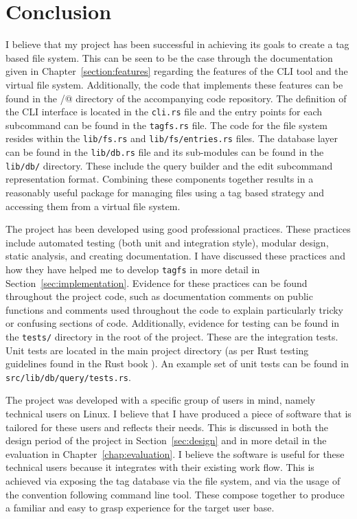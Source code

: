 \chapter{Conclusion}
\vspace{1cm}

I believe that my project has been successful in achieving its goals to create
a tag based file system. This can be seen to be the case through the
documentation given in Chapter~\ref{section:features} regarding the features of
the CLI tool and the virtual file system. Additionally, the code that
implements these features can be found in the \verb@src/@ directory of the
accompanying code repository. The definition of the CLI interface is located in
the \texttt{cli.rs} file and the entry points for each subcommand can be found
in the \texttt{tagfs.rs} file. The code for the file system resides within the
\texttt{lib/fs.rs} and \texttt{lib/fs/entries.rs} files. The database layer can
be found in the \texttt{lib/db.rs} file and its sub-modules can be found in the
\texttt{lib/db/} directory. These include the query builder and the edit
subcommand representation format. Combining these components together results
in a reasonably useful package for managing files using a tag based strategy
and accessing them from a virtual file system.

The project has been developed using good professional practices. These
practices include automated testing (both unit and integration style), modular
design, static analysis, and creating documentation. I have discussed these
practices and how they have helped me to develop \texttt{tagfs} in more detail
in Section~\ref{sec:implementation}. Evidence for these practices can be found
throughout the project code, such as documentation comments on public functions
and comments used throughout the code to explain particularly tricky or
confusing sections of code. Additionally, evidence for testing can be found in
the \texttt{tests/} directory in the root of the project. These are the
integration tests. Unit tests are located in the main project directory (as per
Rust testing guidelines found in the Rust book \cite{rust-testing}). An example
set of unit tests can be found in \texttt{src/lib/db/query/tests.rs}.

The project was developed with a specific group of users in mind, namely
technical users on Linux. I believe that I have produced a piece of software
that is tailored for these users and reflects their needs.
This is discussed in both the design period of the project in
Section~\ref{sec:design} and in more detail in the evaluation in
Chapter~\ref{chap:evaluation}. I believe the software is useful for these
technical users because it integrates with their existing work flow. This is
achieved via exposing the tag database via the file system, and via the usage
of the convention following command line tool. These compose together to
produce a familiar and easy to grasp experience for the target user base.
